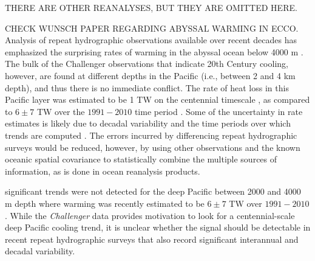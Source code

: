 \documentclass[authoryear,round,12pt]{article}
\begin{document}

THERE ARE OTHER REANALYSES, BUT THEY ARE OMITTED HERE.


CHECK WUNSCH PAPER REGARDING ABYSSAL WARMING IN ECCO.
Analysis of repeat hydrographic observations available over recent
decades has emphasized the surprising rates of warming in the abyssal
ocean below 4000 m
\citep[e.g.,][]{Johnson-Mecking-2007:Recent,Purkey-Johnson-2010:Warming}.
The bulk of the Challenger observations that indicate 20th Century cooling, however, are found at different depths in the Pacific (i.e., between 2 and 4 km depth), and thus there is no immediate conflict. The rate of heat loss in this Pacific layer was estimated to be 1 TW on the centennial timescale \citep{Gebbie-Huybers-2019:Little}, as compared to $6 \pm 7$ TW over the $1991-2010$ time period \citep{Desbruy`e-Purkey-2016:Deep}. Some of the uncertainty in rate estimates is likely due to decadal variability and the time periods over which trends are computed \citep{Wunsch-Heimbach-2014:Bidecadal}. The errors incurred by differencing repeat hydrographic surveys would be reduced, however, by using other observations and the known oceanic spatial covariance to statistically combine the multiple sources of information, as is done in ocean reanalysis products. 

significant trends were not detected for the deep Pacific between 2000 and 4000 m depth where warming was recently estimated to be $6 \pm 7$ TW over $1991-2010$ \cite{Desbruy`e-Purkey-2016:Deep}. 
While the {\it Challenger} data provides motivation to look for a centennial-scale deep Pacific cooling trend, it is unclear whether the signal should be detectable in recent repeat hydrographic surveys that also record significant interannual and decadal variability. 
\end{document}
